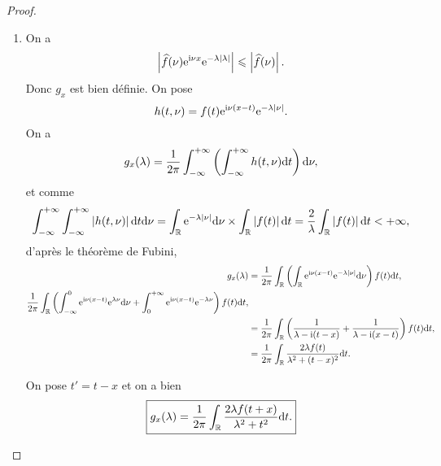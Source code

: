 \begin{proof}
    \phantom{}
    \begin{enumerate}
        \item On a 
        \begin{equation}
            \left\lvert\widehat{f}(\nu)\mathrm{e}^{\mathrm{i}\nu x}\mathrm{e}^{-\lambda\left\lvert\lambda\right\rvert}\right\rvert\leqslant\left\lvert \widehat{f}(\nu)\right\rvert.
        \end{equation}
        Donc $g_x$ est bien définie. On pose 
        \begin{equation}
            h(t,\nu)=f(t)\mathrm{e}^{\mathrm{i}\nu(x-t)}\mathrm{e}^{-\lambda\left\lvert\nu\right\rvert}.
        \end{equation}
        On a 
        \begin{equation}
            g_x(\lambda)=\frac{1}{2\pi}\int_{-\infty}^{+\infty}\left(\int_{-\infty}^{+\infty}h(t,\nu)\mathrm{d} t\right)\mathrm{d}\nu,
        \end{equation}
        et comme 
        \begin{equation}
            \int_{-\infty}^{+\infty}\int_{-\infty}^{+\infty}\left\lvert h(t,\nu)\right\rvert\mathrm{d} t\mathrm{d}\nu=\int_{\mathbb{R}}\mathrm{e}^{-\lambda\left\lvert\nu\right\rvert}\mathrm{d}\nu\times\int_{\mathbb{R}}\left\lvert f(t)\right\rvert\mathrm{d} t=\frac{2}{\lambda}\int_{\mathbb{R}}\left\lvert f(t)\right\rvert\mathrm{d} t<+\infty,
        \end{equation}
        d'après le théorème de Fubini,
        \begin{align}
            g_x(\lambda)
            &=\frac{1}{2\pi}\int_{\mathbb{R}}\left(\int_{\mathbb{R}}\mathrm{e}^{\mathrm{i}\nu(x-t)}\mathrm{e}^{-\lambda\left\lvert\nu\right\rvert}\mathrm{d} \nu\right)f(t)\mathrm{d} t,\\
            \frac{1}{2\pi}\int_{\mathbb{R}}\left(\int_{-\infty}^{0}\mathrm{e}^{\mathrm{i}\nu(x-t)}\mathrm{e}^{\lambda\nu}\mathrm{d} \nu+\int_{0}^{+\infty}\mathrm{e}^{\mathrm{i}\nu(x-t)}\mathrm{e}^{-\lambda\nu}\right)f(t)\mathrm{d} t,\\
            &=\frac{1}{2\pi}\int_{\mathbb{R}}\left(\frac{1}{\lambda-\mathrm{i}(t-x)}+\frac{1}{\lambda-\mathrm{i}(x-t)}\right)f(t)\mathrm{d} t,\\
            &=\frac{1}{2\pi}\int_{\mathbb{R}}\frac{2\lambda f(t)}{\lambda^{2}+(t-x)^{2}}\mathrm{d} t.
        \end{align}

        On pose $t'=t-x$ et on a bien 
        \begin{equation}
            \boxed{
                g_x(\lambda)=\frac{1}{2\pi}\int_{\mathbb{R}}\frac{2\lambda f(t+x)}{\lambda^{2}+t^{2}}\mathrm{d} t.
            }
        \end{equation}


\end{enumerate}
\end{proof}
